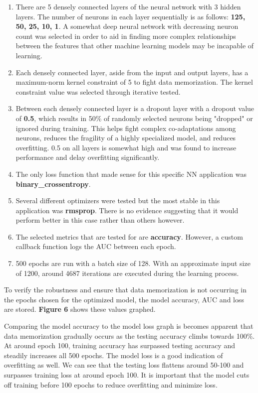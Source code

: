 \documentclass[11pt]{article}
\begin{document}
	
	\begin{enumerate}
		\item There are 5 densely connected layers of the neural network with 3 hidden layers. The number of neurons in each layer sequentially is as follows: \textbf{ 125, 50, 25, 10, 1}. A somewhat deep neural network with decreasing neuron count was selected in order to aid in finding more complex relationships between the features that other machine learning models may be incapable of learning.
		\item Each densely connected layer, aside from the input and output layers, has a maximum-norm kernel constraint of 5 to fight data memorization. The kernel constraint value was selected through iterative tested.
		\item Between each densely connected layer is a dropout layer with a dropout value of \textbf{0.5}, which results in 50\% of randomly selected neurons being "dropped" or ignored during training. This helps fight complex co-adaptations among neurons, reduces the fragility of a highly specialized model, and reduces overfitting. 0.5 on all layers is somewhat high and was found to increase performance and delay overfitting significantly.
		\item The only loss function that made sense for this specific NN application was  \textbf{binary\_crossentropy}.
		\item Several different optimizers were tested but the most stable in this application was \textbf{rmsprop}. There is no evidence suggesting that it would perform better in this case rather than others however.
		\item The selected metrics that are tested for are \textbf{accuracy}. However, a custom callback function logs the AUC between each epoch.
		\item 500 epochs are run with a batch size of 128. With an approximate input size of 1200, around 4687 iterations are executed during the learning process.
	\end{enumerate}

    To verify the robustness and ensure that data memorization is not occurring in the epochs chosen for the optimized model, the model accuracy, AUC and loss are stored. \textbf{Figure 6} shows these values graphed.

	Comparing the model accuracy to the model loss graph is becomes apparent that data memorization gradually occurs as the testing accuracy climbs towards 100\%. At around epoch 100, training accuracy has surpassed testing accuracy and steadily increases all 500 epochs. The model loss is a good indication of overfitting as well. We can see that the testing loss flattens around 50-100 and surpasses training loss at around epoch 100. It is important that the model cuts off training before 100 epochs to reduce overfitting and minimize loss. 
\end{document}
